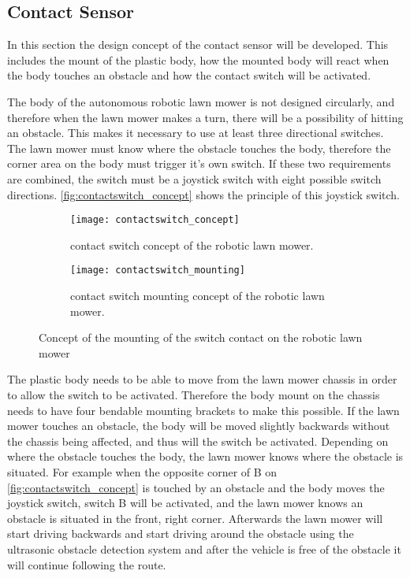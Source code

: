 \subsection{Contact Sensor}
In this section the design concept of the contact sensor will be developed. This includes the mount of the plastic body, how the mounted body will react when the body touches an obstacle and how the contact switch will be activated.

The body of the autonomous robotic lawn mower is not designed circularly, and therefore when the lawn mower makes a turn, there will be a possibility of hitting an obstacle. This makes it necessary to use at least three directional switches. The lawn mower must know where the obstacle touches the body, therefore the corner area on the body must trigger it's own switch. If these two requirements are combined, the switch must be a joystick switch with eight possible switch directions. \autoref{fig:contactswitch_concept} shows the principle of this joystick switch.  

\begin{figure}[htb]
	\centering
	\begin{subfigure}[b]{0.45\textwidth}
		\texttt{[image: contactswitch\_concept]}
		\caption{contact switch concept of the robotic lawn mower.}
		\label{fig:contactswitch_concept}
	\end{subfigure}
	\begin{subfigure}[b]{0.45\textwidth}
		\texttt{[image: contactswitch\_mounting]}
		\caption{contact switch mounting concept of the robotic lawn mower.}
		\label{fig:contactswitch_mounting}
	\end{subfigure}
	\caption{Concept of the mounting of the switch contact on the robotic lawn mower}\label{fig:mount_concept}
\end{figure}


The plastic body needs to be able to move from the lawn mower chassis in order to allow the switch to be activated. Therefore the body mount on the chassis needs to have four bendable mounting brackets to make this possible. If the lawn mower touches an obstacle, the body will be moved slightly backwards without the chassis being affected, and thus will the switch be activated. Depending on where the obstacle touches the body, the lawn mower knows where the obstacle is situated. For example when the opposite corner of B on \autoref{fig:contactswitch_concept} is touched by an obstacle and the body moves the joystick switch, switch B will be activated, and the lawn mower knows an obstacle is situated in the front, right corner. Afterwards the lawn mower will start driving backwards and start driving around the obstacle using the ultrasonic obstacle detection system and after the vehicle is free of the obstacle it will continue following the route.

